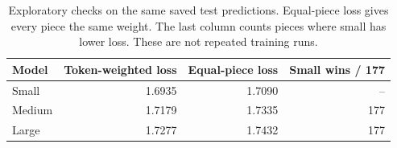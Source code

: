 \begin{table}[H]
\centering
\caption{Exploratory checks on the same saved test predictions. Equal-piece loss gives every piece the same weight. The last column counts pieces where small has lower loss. These are not repeated training runs.}
\label{tab:pairedtest}
\begin{tabular}{lrrr}
\toprule Model & Token-weighted loss & Equal-piece loss & Small wins / 177\\\midrule
Small & 1.6935 & 1.7090 & --\\
Medium & 1.7179 & 1.7335 & 177\\
Large & 1.7277 & 1.7432 & 177\\
\bottomrule
\end{tabular}
\end{table}
